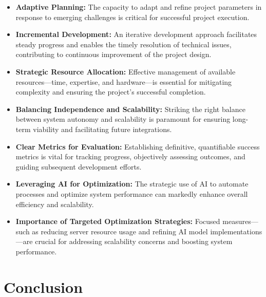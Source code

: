 \begin{itemize}
    \item \textbf{Adaptive Planning:} The capacity to adapt and refine project parameters in response to emerging challenges is critical for successful project execution.
    \item \textbf{Incremental Development:} An iterative development approach facilitates steady progress and enables the timely resolution of technical issues, contributing to continuous improvement of the project design.
    \item \textbf{Strategic Resource Allocation:} Effective management of available resources—time, expertise, and hardware—is essential for mitigating complexity and ensuring the project’s successful completion.
    \item \textbf{Balancing Independence and Scalability:} Striking the right balance between system autonomy and scalability is paramount for ensuring long-term viability and facilitating future integrations.
    \item \textbf{Clear Metrics for Evaluation:} Establishing definitive, quantifiable success metrics is vital for tracking progress, objectively assessing outcomes, and guiding subsequent development efforts.
    \item \textbf{Leveraging AI for Optimization:} The strategic use of AI to automate processes and optimize system performance can markedly enhance overall efficiency and scalability.
    \item \textbf{Importance of Targeted Optimization Strategies:} Focused measures—such as reducing server resource usage and refining AI model implementations—are crucial for addressing scalability concerns and boosting system performance.
\end{itemize}

\section{Conclusion}


